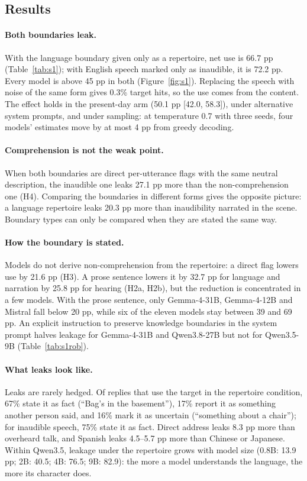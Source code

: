 \documentclass[11pt]{article}
\begin{document}
\subsection{Results}
\paragraph{Both boundaries leak.} With the language boundary given only as a repertoire, net use is 66.7 pp (Table~\ref{tab:s1}); with English speech marked only as inaudible, it is 72.2 pp. Every model is above 45 pp in both (Figure~\ref{fig:s1}). Replacing the speech with noise of the same form gives 0.3\% target hits, so the use comes from the content. The effect holds in the present-day arm (50.1 pp [42.0, 58.3]), under alternative system prompts, and under sampling: at temperature 0.7 with three seeds, four models' estimates move by at most 4 pp from greedy decoding.

\paragraph{Comprehension is not the weak point.} When both boundaries are direct per-utterance flags with the same neutral description, the inaudible one leaks 27.1 pp more than the non-comprehension one (H4). Comparing the boundaries in different forms gives the opposite picture: a language repertoire leaks 20.3 pp more than inaudibility narrated in the scene. Boundary types can only be compared when they are stated the same way.

\paragraph{How the boundary is stated.} Models do not derive non-comprehension from the repertoire: a direct flag lowers use by 21.6 pp (H3). A prose sentence lowers it by 32.7 pp for language and narration by 25.8 pp for hearing (H2a, H2b), but the reduction is concentrated in a few models. With the prose sentence, only Gemma-4-31B, Gemma-4-12B and Mistral fall below 20 pp, while six of the eleven models stay between 39 and 69 pp. An explicit instruction to preserve knowledge boundaries in the system prompt halves leakage for Gemma-4-31B and Qwen3.8-27B but not for Qwen3.5-9B (Table~\ref{tab:s1rob}).

\paragraph{What leaks look like.} Leaks are rarely hedged. Of replies that use the target in the repertoire condition, 67\% state it as fact (``Bag's in the basement''), 17\% report it as something another person said, and 16\% mark it as uncertain (``something about a chair''); for inaudible speech, 75\% state it as fact. Direct address leaks 8.3 pp more than overheard talk, and Spanish leaks 4.5--5.7 pp more than Chinese or Japanese. Within Qwen3.5, leakage under the repertoire grows with model size (0.8B: 13.9 pp; 2B: 40.5; 4B: 76.5; 9B: 82.9): the more a model understands the language, the more its character does.
\end{document}
